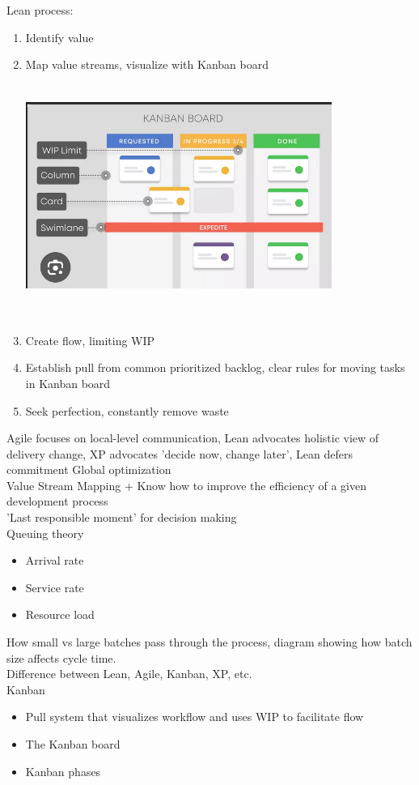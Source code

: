 \documentclass[10pt]{article}
\begin{document}
Lean process:
\begin{enumerate}
\item Identify value
\item Map value streams, visualize with Kanban board\\
\includegraphics[width=10cm, height=8cm]{KBoard}
\item Create flow, limiting WIP
\item Establish pull from common prioritized backlog, clear rules for moving tasks in Kanban board
\item Seek perfection, constantly remove waste
\end{enumerate}
Agile focuses on local-level communication, Lean advocates holistic view of delivery change, XP advocates 'decide now, change later', Lean defers commitment
Global optimization\\
Value Stream Mapping + Know how to improve the efficiency of a given development process\\
'Last responsible moment' for decision making\\
Queuing theory
\begin{itemize}
\item Arrival rate
\item Service rate
\item Resource load
\end{itemize}
How small vs large batches pass through the process, diagram showing how batch size affects cycle time.\\
Difference between Lean, Agile, Kanban, XP, etc.\\
Kanban
\begin{itemize}
\item Pull system that visualizes workflow and uses WIP to facilitate flow
\item The Kanban board
\item Kanban phases
\end{itemize}
\end{document}

